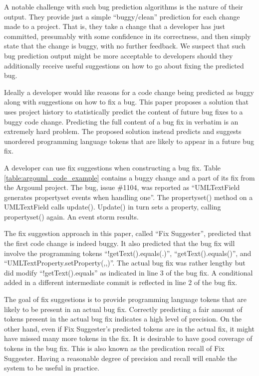 \documentclass[conference]{IEEEtran}
\begin{document}
A notable challenge with such bug prediction algorithms is the nature of their output. They provide just a simple ``buggy/clean'' prediction for each change made to a project. That is, they take a change that a developer has just committed, presumably with some confidence in its correctness, and then simply state that the change is buggy, with no further feedback. We suspect that such bug prediction output might be more acceptable to developers should they additionally receive useful suggestions on how to go about fixing the predicted bug.

Ideally a developer would like reasons for a code change being predicted as buggy along with suggestions on how to fix a bug. This paper proposes a solution that uses project history to statistically predict
the content of future bug fixes to a buggy code change. Predicting the full content of a
bug fix in verbatim is an extremely hard problem.  The proposed solution
instead predicts and suggests unordered programming language tokens
that are likely to appear in a future bug fix.

A developer can use fix suggestions when constructing a bug fix. Table \ref{table:argouml_code_example} contains a buggy change and a part of its fix from the Argouml project. The bug, issue \#1104, was reported as ``UMLTextField generates propertyset events when handling one''. The propertyset() method on a UMLTextField calls update(). Update() in turn sets a property, calling propertyset() again. An event storm results.

The fix suggestion approach in this paper, called ``Fix Suggester'', predicted that the first code change is indeed buggy. It also predicted that the bug fix will involve the programming tokens ``!getText().equals(.)'', ``getText().equals()'', and ``UMLTextProperty.setProperty(,,)''. The actual bug fix was rather lengthy but did modify ``!getText().equals'' as indicated in line 3 of the bug fix. A conditional added in a different intermediate commit is reflected in line 2 of the bug fix.

The goal of fix suggestions is to provide programming language tokens that are likely to be present in an actual bug fix. Correctly predicting a fair amount of tokens present in the actual bug fix indicates a high level of precision. On the other hand, even if Fix Suggester's predicted tokens are in the actual fix, it might have missed many more tokens in the fix. It is desirable to have good coverage of tokens in the bug fix. This is also known as the predication recall of Fix Suggester. Having a reasonable degree of precision and recall will enable the system to be useful in practice.
\end{document}
